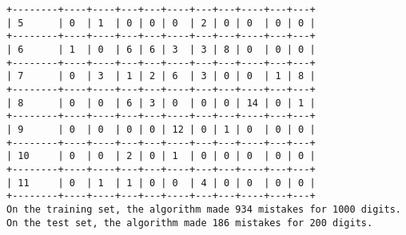 \documentclass{article}
\begin{document}
\begin{lstlisting}[title=Beispielausgabe]
+--------+----+----+---+---+----+---+---+----+---+---+
| 5      | 0  | 1  | 0 | 0 | 0  | 2 | 0 | 0  | 0 | 0 |
+--------+----+----+---+---+----+---+---+----+---+---+
| 6      | 1  | 0  | 6 | 6 | 3  | 3 | 8 | 0  | 0 | 0 |
+--------+----+----+---+---+----+---+---+----+---+---+
| 7      | 0  | 3  | 1 | 2 | 6  | 3 | 0 | 0  | 1 | 8 |
+--------+----+----+---+---+----+---+---+----+---+---+
| 8      | 0  | 0  | 6 | 3 | 0  | 0 | 0 | 14 | 0 | 1 |
+--------+----+----+---+---+----+---+---+----+---+---+
| 9      | 0  | 0  | 0 | 0 | 12 | 0 | 1 | 0  | 0 | 0 |
+--------+----+----+---+---+----+---+---+----+---+---+
| 10     | 0  | 0  | 2 | 0 | 1  | 0 | 0 | 0  | 0 | 0 |
+--------+----+----+---+---+----+---+---+----+---+---+
| 11     | 0  | 1  | 1 | 0 | 0  | 4 | 0 | 0  | 0 | 0 |
+--------+----+----+---+---+----+---+---+----+---+---+
On the training set, the algorithm made 934 mistakes for 1000 digits.
On the test set, the algorithm made 186 mistakes for 200 digits.

\end{lstlisting}
\end{document}
